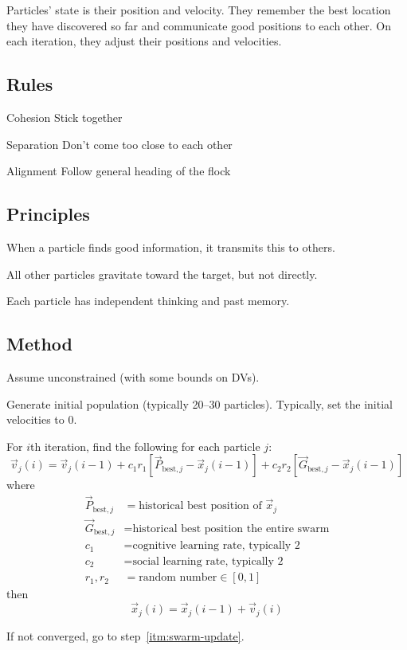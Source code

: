 \documentclass{article}
\begin{document}
Particles' state is their position and velocity. They remember the best location
they have discovered so far and communicate good positions to each other. On
each iteration, they adjust their positions and velocities.

\subsection*{Rules}

\begin{description*}
\item[Cohesion] Stick together
\item[Separation] Don't come too close to each other
\item[Alignment] Follow general heading of the flock
\end{description*}

\subsection*{Principles}

\begin{itemize*}
\item When a particle finds good information, it transmits this to others.
\item All other particles gravitate toward the target, but not directly.
\item Each particle has independent thinking and past memory.
\end{itemize*}

\subsection*{Method}

Assume unconstrained (with some bounds on DVs).
\begin{enumerate*}
\item Generate initial population (typically 20--30 particles). Typically, set the initial velocities to 0.
\item \label{itm:swarm-update} For \(i\)th iteration, find the following for each particle \(j\):
  \[\vec{v}_j(i) = \vec{v}_j(i - 1) + c_1r_1\left[\vec{P}_{\text{best},j} - \vec{x}_j(i-1)\right] + c_2r_2\left[\vec{G}_{\text{best},j} - \vec{x}_j(i - 1)\right]\]
  where
  \begin{align*}
    \vec{P}_{\text{best},j} &= \text{historical best position of } \vec{x}_j \\
    \vec{G}_{\text{best},j} &= \text{historical best position the entire swarm} \\
    c_1 &= \text{cognitive learning rate, typically 2} \\
    c_2 &= \text{social learning rate, typically 2} \\
    r_1,r_2 &= \text{random number} \in [0,1]
  \end{align*}
  then
  \[\vec{x}_j(i) = \vec{x}_j(i - 1) + \vec{v}_j(i)\]
\item If not converged, go to step~\ref{itm:swarm-update}.
\end{enumerate*}
\end{document}
